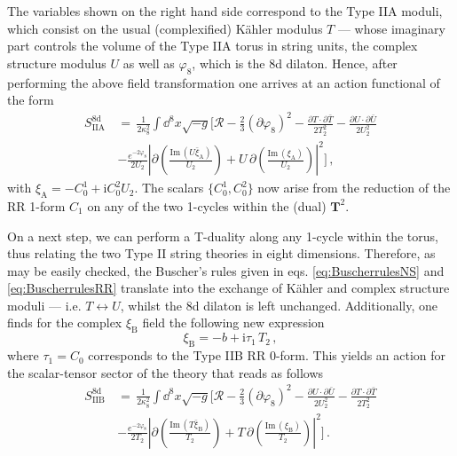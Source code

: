 %
The variables shown on the right hand side correspond to the Type IIA moduli, which consist on the usual (complexified) K\"ahler modulus $T$ --- whose imaginary part controls the volume of the Type IIA torus in string units, the complex structure modulus $U$ as well as $\varphi_8$, which is the 8d dilaton. Hence, after performing the above field transformation one arrives at an action functional of the form
%
\begin{equation}\label{eq:8dIIA}
			\begin{aligned}
				S_\text{IIA}^{\text{8d}}\, &=\, \frac{1}{2\kappa_{8}^2} \int \dd^{8}x\sqrt{-g} \Bigg[\mathcal{R} - \frac{2}{3} \left( \partial \varphi_8\right)^2-\frac{\partial T \cdot \partial \bar T}{2 T_2^2}  -\frac{\partial U \cdot \partial \bar U}{2 U_2^2}\\
                & -\frac{e^{-2\varphi_8}}{2 U_2} \left| \partial \left( \frac{\text{Im}\, (U \bar{\xi}_{\text{A}})}{U_2}\right) + U\, \partial \left( \frac{\text{Im}\, (\xi_{\text{A}})}{U_2}\right)\right|^2\Bigg]\, ,
			\end{aligned}
\end{equation}
%
with $\xi_{\text{A}}=-C_0^{1}+\text{i} C_0^{2} U_2$. The scalars $\lbrace C_0^{1},C_0^{2} \rbrace$ now arise from the reduction of the RR 1-form $C_1$ on any of the two 1-cycles within the (dual) $\mathbf{T}^2$.

On a next step, we can perform a T-duality along any 1-cycle within the torus, thus relating the two Type II string theories in eight dimensions. Therefore, as may be easily checked, the Buscher's rules given in eqs. \eqref{eq:BuscherrulesNS} and \eqref{eq:BuscherrulesRR} translate into the exchange of K\"ahler and complex structure moduli --- i.e. $T \leftrightarrow U$, whilst the 8d dilaton is left unchanged. Additionally, one finds for the complex $\xi_{\text{B}}$ field the following new expression
%
\begin{equation}
    \xi_{\text{B}}= -b+\text{i} \tau_1\, T_2\, ,
\end{equation}
%
where $\tau_1=C_0$ corresponds to the Type IIB RR 0-form. This yields an action for the scalar-tensor sector of the theory that reads as follows
%
\begin{equation}\label{eq:8dIIB}
			\begin{aligned}
				S_\text{IIB}^{\text{8d}}\, &=\, \frac{1}{2\kappa_{8}^2} \int \dd^{8}x\sqrt{-g} \Bigg[\mathcal{R} - \frac{2}{3} \left( \partial \varphi_8\right)^2 -\frac{\partial U \cdot \partial \bar U}{2 U_2^2}-\frac{\partial T \cdot \partial \bar T}{2 T_2^2}\\
                & -\frac{e^{-2\varphi_8}}{2 T_2} \left| \partial \left( \frac{\text{Im}\, (T \bar{\xi}_{\text{B}})}{T_2}\right) + T\, \partial \left( \frac{\text{Im}\, (\xi_{\text{B}})}{T_2}\right)\right|^2\Bigg]\, .
			\end{aligned}
\end{equation}
%

